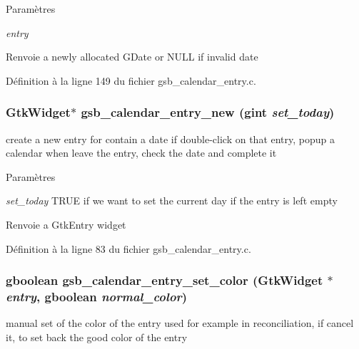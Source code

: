 \begin{DoxyParams}{Paramètres}
\item[{\em entry}]\end{DoxyParams}
\begin{DoxyReturn}{Renvoie}
a newly allocated GDate or NULL if invalid date 
\end{DoxyReturn}


Définition à la ligne 149 du fichier gsb\_\-calendar\_\-entry.c.

\subsubsection[{gsb\_\-calendar\_\-entry\_\-new}]{\setlength{\rightskip}{0pt plus 5cm}GtkWidget$\ast$ gsb\_\-calendar\_\-entry\_\-new (gint {\em set\_\-today})}\label{gsb__calendar__entry_8c_afc3a9a10d06b658715e71451cd8bd97f}
create a new entry for contain a date if double-\/click on that entry, popup a calendar when leave the entry, check the date and complete it


\begin{DoxyParams}{Paramètres}
\item[{\em set\_\-today}]TRUE if we want to set the current day if the entry is left empty\end{DoxyParams}
\begin{DoxyReturn}{Renvoie}
a GtkEntry widget 
\end{DoxyReturn}


Définition à la ligne 83 du fichier gsb\_\-calendar\_\-entry.c.

\subsubsection[{gsb\_\-calendar\_\-entry\_\-set\_\-color}]{\setlength{\rightskip}{0pt plus 5cm}gboolean gsb\_\-calendar\_\-entry\_\-set\_\-color (GtkWidget $\ast$ {\em entry}, \/  gboolean {\em normal\_\-color})}\label{gsb__calendar__entry_8c_a96d4491d6d3f64c9a1e567305cbfae82}
manual set of the color of the entry used for example in reconciliation, if cancel it, to set back the good color of the entry



